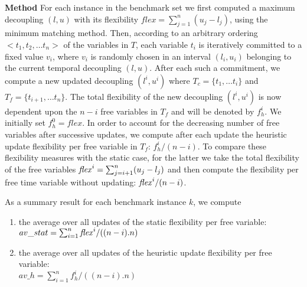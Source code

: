 \noindent
{\bf Method }For each instance in the benchmark set we first computed a maximum decoupling $(l, u)$ with its flexibility $flex = \sum^n_{j=1} (u_j - l_j)$, using the minimum matching method. Then, according to an arbitrary ordering $< t_1, t_2, \ldots t_n >$ of the variables in $T$, each variable $t_i$ is iteratively committed to a fixed value $v_i$, where $v_i$ is randomly chosen in an interval $(l_i, u_i)$ belonging to the current temporal decoupling $(l, u)$. 
After each such a commitment, we compute a new updated decoupling $(l^i, u^i)$ where $T_c = \{t_1, \ldots t_i \}$ and $T_f = \{ t_{i+1}, \ldots t_n \}$.
The total flexibility of the new decoupling $(l^i, u^i)$ is now dependent upon the $n - i$ free variables in $T_f$ and will be denoted by $f^{i}_h$. 
We initially set $f^0_h = flex$.
In order to account for the decreasing number of free variables after successive updates, we compute after each update the heuristic update flexibility per free variable in $T_f$: $f^{i}_h/(n-i)$. To compare these flexibility measures with the static case, for the latter we take the total flexibility of the free variables $\mathit{flex}^i = \sum^n_{j=i+1} (u_j - l_j)$ and then compute the flexibility per free time variable without updating: $\mathit{flex}^i/(n-i)$.


As a summary result for each benchmark instance $k$, we compute 
\begin{enumerate}
\item the average over all updates of the static flexibility per free variable: \\ $av\_stat = \sum^n_{i=1} \mathit{flex}^{i}/((n-i).n) $  
\item the average over all updates of the heuristic update flexibility per free variable: \\
$av\_h = \sum^n_{i=1} f^{i}_h/((n-i).n)$ 
\end{enumerate}

